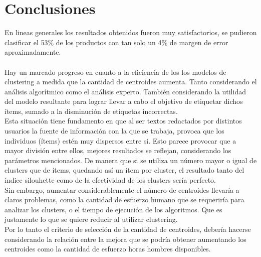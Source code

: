 \section{Conclusiones}

En lineas generales los resultados obtenidos fueron muy satisfactorios, se pudieron clasificar el 53\% de los productos con tan solo un 
4\% de margen de error aproximadamente. \\
\\
Hay un marcado progreso en cuanto a la eficiencia de los los modelos de clustering a medida que la cantidad de centroides aumenta. Tanto 
considerando el análisis algorítmico como el análisis experto. También considerando la utilidad del modelo resultante para lograr llevar a cabo el objetivo
de etiquetar dichos ítems, sumado a la disminución de etiquetas incorrectas.\\
Esta situación tiene fundamento en que al ser textos redactados por distintos usuarios la fuente de información con la que se trabaja, provoca que 
los individuos (ítems) estén muy dispersos entre sí. Esto parece provocar que a mayor división entre ellos, mejores resultados se reflejan, considerando los 
parámetros mencionados. De manera que si se utiliza un número mayor o igual de clusters que de ítems, quedando así un ítem por cluster, 
el resultado tanto del índice silouhette como de la efectividad de los clusters sería perfecto.\\
Sin embargo, aumentar considerablemente el número de centroides llevaría a claros problemas, como la cantidad de esfuerzo humano que se requeriría 
para analizar los clusters, o el tiempo de ejecución de los algoritmos. Que es justamente lo que se quiere reducir al utilizar clustering.\\
Por lo tanto el criterio de selección de la cantidad de centroides, debería hacerse considerando la relación entre la mejora que se podría obtener 
aumentando los centroides como la cantidad de esfuerzo horas hombres disponibles.\\

